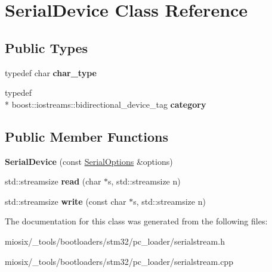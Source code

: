 \hypertarget{class_serial_device}{\section{Serial\-Device Class Reference}
\label{class_serial_device}
}
\subsection*{Public Types}
\begin{DoxyCompactItemize}
\item 
\hypertarget{class_serial_device_ace4f9a45afb474575627c5dc0244a15c}{typedef char {\bfseries char\-\_\-type}}\label{class_serial_device_ace4f9a45afb474575627c5dc0244a15c}

\item 
\hypertarget{class_serial_device_a41b24fbe04720d910879bcbad560db58}{typedef \\*
boost\-::iostreams\-::bidirectional\-\_\-device\-\_\-tag {\bfseries category}}\label{class_serial_device_a41b24fbe04720d910879bcbad560db58}

\end{DoxyCompactItemize}
\subsection*{Public Member Functions}
\begin{DoxyCompactItemize}
\item 
\hypertarget{class_serial_device_a803aeeb328e365032d3f575453b9d9d4}{{\bfseries Serial\-Device} (const \hyperlink{class_serial_options}{Serial\-Options} \&options)}\label{class_serial_device_a803aeeb328e365032d3f575453b9d9d4}

\item 
\hypertarget{class_serial_device_a7dbee66826991dfd958b1c3df0290767}{std\-::streamsize {\bfseries read} (char $\ast$s, std\-::streamsize n)}\label{class_serial_device_a7dbee66826991dfd958b1c3df0290767}

\item 
\hypertarget{class_serial_device_a1df3be13012fa45388a05a8dab2b08a9}{std\-::streamsize {\bfseries write} (const char $\ast$s, std\-::streamsize n)}\label{class_serial_device_a1df3be13012fa45388a05a8dab2b08a9}

\end{DoxyCompactItemize}


The documentation for this class was generated from the following files\-:\begin{DoxyCompactItemize}
\item 
miosix/\-\_\-tools/bootloaders/stm32/pc\-\_\-loader/serialstream.\-h\item 
miosix/\-\_\-tools/bootloaders/stm32/pc\-\_\-loader/serialstream.\-cpp\end{DoxyCompactItemize}
